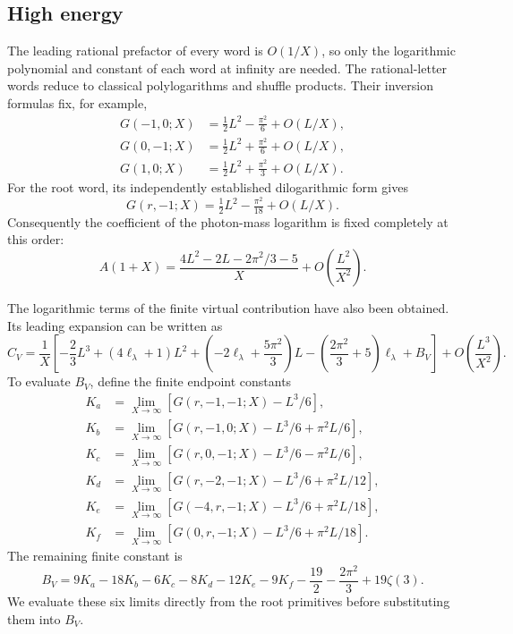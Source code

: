 \subsection{High energy}
The leading rational prefactor of every word is $O(1/X)$, so only the
logarithmic polynomial and constant of each word at infinity are needed.
The rational-letter words reduce to classical polylogarithms and shuffle
products.  Their inversion formulas fix, for example,
\begin{align}
 G(-1,0;X)&=\tfrac12L^2-\tfrac{\pi^2}{6}+O(L/X),\\
 G(0,-1;X)&=\tfrac12L^2+\tfrac{\pi^2}{6}+O(L/X),\\
 G(1,0;X)&=\tfrac12L^2+\tfrac{\pi^2}{3}+O(L/X).
\end{align}
For the root word, its independently established dilogarithmic form gives
\begin{equation}
 G(r,-1;X)=\tfrac12L^2-\tfrac{\pi^2}{18}+O(L/X).
\end{equation}
Consequently the coefficient of the photon-mass logarithm is fixed
completely at this order:
\begin{equation}
 A(1+X)=\frac{4L^2-2L-2\pi^2/3-5}{X}
 +O\!\left(\frac{L^2}{X^2}\right).
 \label{eq:compton-independent-ir-high}
\end{equation}

The logarithmic terms of the finite virtual contribution have also been
obtained.  Its leading expansion can be written as
\begin{equation}
 C_V=\frac1X\left[
 -\frac23L^3+(4\ell_\lambda+1)L^2
 +\left(-2\ell_\lambda+\frac{5\pi^2}{3}\right)L
 -\left(\frac{2\pi^2}{3}+5\right)\ell_\lambda+B_V
 \right]+O\!\left(\frac{L^3}{X^2}\right).
\end{equation}
To evaluate $B_V$, define the finite endpoint constants
\begin{align}
 K_a&=\lim_{X\to\infty}\left[G(r,-1,-1;X)-L^3/6\right],\\
 K_b&=\lim_{X\to\infty}\left[G(r,-1,0;X)-L^3/6+\pi^2L/6\right],\\
 K_c&=\lim_{X\to\infty}\left[G(r,0,-1;X)-L^3/6-\pi^2L/6\right],\\
 K_d&=\lim_{X\to\infty}\left[G(r,-2,-1;X)-L^3/6+\pi^2L/12\right],\\
 K_e&=\lim_{X\to\infty}\left[G(-4,r,-1;X)-L^3/6+\pi^2L/18\right],\\
 K_f&=\lim_{X\to\infty}\left[G(0,r,-1;X)-L^3/6+\pi^2L/18\right].
\end{align}
The remaining finite constant is
\begin{equation}
 B_V=9K_a-18K_b-6K_c-8K_d-12K_e-9K_f
 -\frac{19}{2}-\frac{2\pi^2}{3}+19\zeta(3).
\end{equation}
We evaluate these six limits directly from the root primitives before
substituting them into $B_V$.

